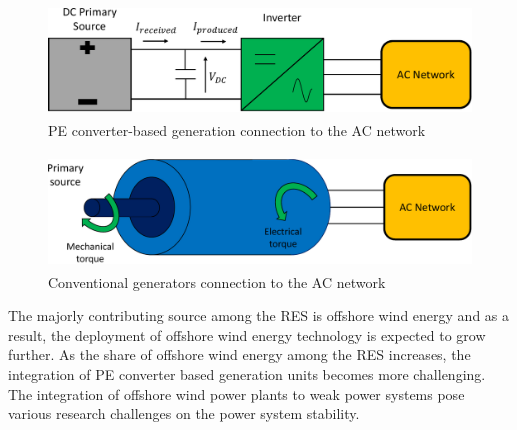 \begin{figure}[H]
\centering
    \includegraphics[height = 3cm,width = 12cm]{Diagrams/Chapter_1/Energy_conv_system_2.pdf}
    \caption{PE converter-based generation connection to the AC network \cite{denis_migrate_2018}}
    \label{fig:Energy_conv_system_2}
\end{figure}
\vspace{0mm}
\begin{figure}[H]
\centering
    \includegraphics[height = 3cm,width = 12.5cm]{Diagrams/Chapter_1/Energy_conv_system.pdf}
    \caption{Conventional generators connection to the AC network \cite{denis_migrate_2018}}
    \label{fig:Energy_conv_system}
\end{figure}

The majorly contributing source among the \gls{RES} is offshore wind energy and as a result, the deployment of offshore wind energy technology is expected to grow further. As the share of offshore wind energy among the \gls{RES} increases, the integration of \gls{PE} converter based generation units becomes more challenging. The integration of offshore wind power plants to weak power systems pose various research challenges on the power system stability. 


